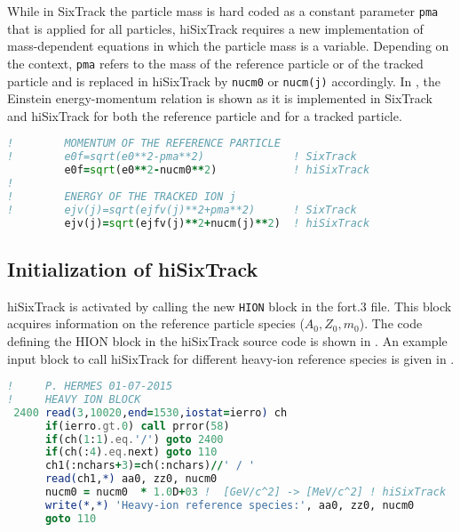 \begin{appendices}
While in SixTrack the particle mass is hard coded as a constant parameter \lstinline{pma} that is applied for all particles, hiSixTrack requires a new implementation of mass-dependent equations in which the particle mass is a variable. Depending on the context, \lstinline{pma} refers to the mass of the reference particle or of the tracked particle and is replaced in hiSixTrack by \lstinline{nucm0} or \lstinline{nucm(j)} accordingly. In  , the Einstein energy-momentum relation is shown as it is implemented in SixTrack and hiSixTrack for both the reference particle and for a tracked particle.
\vspace{0.5cm}

\begin{minipage}{\linewidth}
\begin{lstlisting}[language=Fortran,caption=Definition of the reference momentum $P_0$ and the energy $E$ of the tracked ion in SixTrack and hiSixTrack.,label=listing_einstein]
!        MOMENTUM OF THE REFERENCE PARTICLE
!        e0f=sqrt(e0**2-pma**2)              ! SixTrack
         e0f=sqrt(e0**2-nucm0**2)            ! hiSixTrack
!
!        ENERGY OF THE TRACKED ION j
!        ejv(j)=sqrt(ejfv(j)**2+pma**2)      ! SixTrack
         ejv(j)=sqrt(ejfv(j)**2+nucm(j)**2)  ! hiSixTrack
\end{lstlisting}
\end{minipage}

\subsection{Initialization of hiSixTrack}

hiSixTrack is activated by calling the new \lstinline{HION} block in the fort.3 file. This block acquires information on the reference particle species ($A_0,Z_0,m_0$). The code defining the HION block in the hiSixTrack source code is shown in . An example input block to call hiSixTrack for different heavy-ion reference species is given in .


\vspace{0.5cm}
\begin{minipage}{\linewidth}
\begin{lstlisting}[language=Fortran,caption=Definition of the information acquisition from the \lstinline{fort.3} in the hiSixTrack source file.,label=lst:hion_src]
!     P. HERMES 01-07-2015
!     HEAVY ION BLOCK
 2400 read(3,10020,end=1530,iostat=ierro) ch
      if(ierro.gt.0) call prror(58)
      if(ch(1:1).eq.'/') goto 2400
      if(ch(:4).eq.next) goto 110
      ch1(:nchars+3)=ch(:nchars)//' / '
      read(ch1,*) aa0, zz0, nucm0
      nucm0 = nucm0  * 1.0D+03 !  [GeV/c^2] -> [MeV/c^2] ! hiSixTrack
      write(*,*) 'Heavy-ion reference species:', aa0, zz0, nucm0
      goto 110
\end{lstlisting}
\end{minipage}



\end{appendices}
